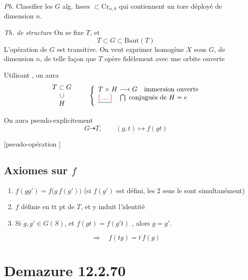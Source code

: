 \documentclass[11pt,a4paper]{article}
\begin{document}
\emph{Pb.} Classifier les $G$ alg. lisses $\subset \mathrm{Cr}_{n,k}$ qui
contiennent un tore déployé de dimension $n$.

\emph{Th. de structure} On se fixe $T$, et
\[
  T \subset G \subset \mathrm{Baut}(T)
\]
L'opération de $G$ est transitive. On veut exprimer \ill{} homogène $X$ sous
$G$, de dimension $n$, de telle façon que $T$ opère fidèlement avec une orbite
ouverte


Utilisant \ill{}, on aura
\[
  \begin{array}{c}
    T \subset G \\
    \cup \\
    H
  \end{array}
  \qquad
  \left\{
  \begin{array}{l}
    T \times H \longrightarrow G \quad \text{immersion ouverte} \\
    \struck{\ill{}} \quad \bigcap \text{ conjugués de } H = e
  \end{array}
  \right.
\]

On aura pseudo-explicitement
\[
  G \dashrightarrow T, \qquad (g, t) \mapsto f(gt)
\]

[pseudo-opération \ill{}]

\subsection*{Axiomes sur $f$}

\begin{enumerate}
  \item[1)] $f(gg') = f\bigl(g\,f(g')\bigr)$ \quad (si $f(g')$ est défini, les
        2 sens le sont simultanément)
  \item[2)] $f$ définie en tt pt de $T$, et y induit l'identité
  \item[3)] Si $g, g' \in G(S)$, et $f(gt) = f(g't)$ \ill{}, alors $g = g'$.
\end{enumerate}
\[
  \Longrightarrow \quad f(tg) = t\,f(g)
\]


\section*{Demazure 12.2.70}
\end{document}
